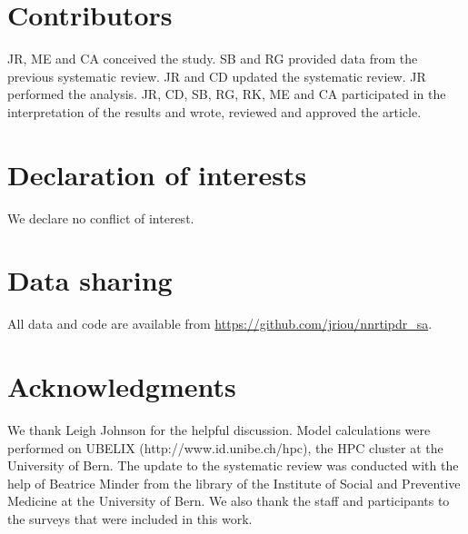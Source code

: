\documentclass{article}
\begin{document}
\section{Contributors}

JR, ME and CA conceived the study. SB and RG provided data from the previous systematic review. JR and CD updated the systematic review. JR performed the analysis. JR, CD, SB, RG, RK, ME and CA participated in the interpretation of the results and wrote, reviewed and approved the article.

\section{Declaration of interests}

We declare no conflict of interest.

\section{Data sharing}

All data and code are available from \url{https://github.com/jriou/nnrtipdr_sa}.

\section{Acknowledgments}
We thank Leigh Johnson for the helpful discussion.
Model calculations were performed on UBELIX (http://www.id.unibe.ch/hpc), the HPC cluster at the University of Bern. The update to the systematic review was conducted with the help of Beatrice Minder from the library of the Institute of Social and Preventive Medicine at the University of Bern. 
 We also thank the staff and participants to the surveys that were included in this work.


\newpage


  
\end{document}
